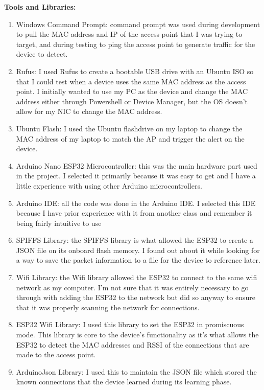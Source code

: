 \documentclass[letterpaper, 11pt]{article}
\newcommand{\secHeader}[1]{\vspace{2mm} \noindent \textbf{#1:}\vspace{-4mm}}
\begin{document}
\secHeader{Tools and Libraries}
\vspace{5mm}
\begin{enumerate}
    \item Windows Command Prompt: command prompt was used during development to pull the MAC address and IP of the access point that I was trying to target, and during testing to 
    ping the access point to generate traffic for the device to detect.
    \item Rufus: I used Rufus to create a bootable USB drive with an Ubuntu ISO so that I could test when a device uses the same MAC address as the access point. I initially wanted to use
    my PC as the device and change the MAC address either through Powershell or Device Manager, but the OS doesn't allow for my NIC to change the MAC address.
    \item Ubuntu Flash: I used the Ubuntu flashdrive on my laptop to change the MAC address of my laptop to match the AP and trigger the alert on the device.
    \item Arduino Nano ESP32 Microcontroller: this was the main hardware part used in the project. I selected it primarily because it was easy to get and I have a little experience with using other 
    Arduino microcontrollers.
    \item Arduino IDE: all the code was done in the Arduino IDE. I selected this IDE because I have prior experience with it from another class and remember it being fairly intuitive to use
    \item SPIFFS Library: the SPIFFS library is what allowed the ESP32 to create a JSON file on its onboard flash memory. I found out about it while looking for a way to save the packet information
    to a file for the device to reference later.
    \item Wifi Library: the Wifi library allowed the ESP32 to connect to the same wifi network as my computer. I'm not sure that it was entirely necessary to go through with adding the ESP32 to the 
    network but did so anyway to ensure that it was properly scanning the network for connections.
    \item ESP32 Wifi Library: I used this library to set the ESP32 in promiscuous mode. This library is core to the device's functionality as it's what allows the ESP32 to detect the 
    MAC addresses and RSSI of the connections that are made to the access point.
    \item ArduinoJson Library: I used this to maintain the JSON file which stored the known connections that the device learned during its learning phase.
\end{enumerate}
\end{document}
